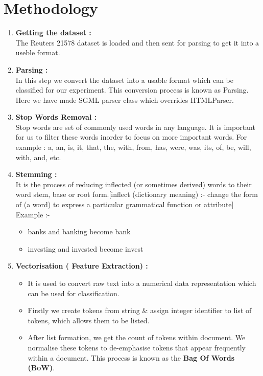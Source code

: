 \documentclass{report}
\begin{document}
\section{\Huge Methodology}
\begin{enumerate}[label=\Roman*.]
\item \textbf{Getting the dataset :}\\
The Reuters 21578 dataset is loaded and then sent for parsing to get it into a useble format.
\item \textbf{Parsing :}\\ In this step we convert the dataset into a usable format which can be classified for our experiment. This conversion process is known as Parsing. Here we have made SGML parser class which overrides HTMLParser.
\item \textbf{Stop Words Removal :}\\ Stop words are set of commonly used words in any language. It is important for us to filter these words inorder to focus on more important words. For example : a, an, is, it, that, the, with, from, has, were,  was, its, of, be, will, with, and, etc.
\item \textbf{Stemming :}\\  It is the process of reducing inflected (or sometimes derived) words to their word stem, base or root form.[inflect (dictionary meaning) :- change the form of (a word) to express a particular grammatical function or attribute]\\
\linebreak
Example :-
 \begin{itemize}
 	\item banks and banking become bank
 	\item investing and invested become invest
 \end{itemize}
 \item \textbf{Vectorisation ( Feature Extraction) :}
 \begin{itemize}
 \item It is used to convert raw text into a numerical data representation which can be used for classification.
 \item Firstly we create tokens from string \& assign integer identifier to list of tokens, which allows them to be listed.
 \item After list formation, we get the count of tokens within document. We normalise these tokens to de-emphasise tokens that appear frequently within a document. This process is known as the \textbf{Bag Of Words (BoW)}.

\end{itemize}
\end{enumerate}
\end{document}
